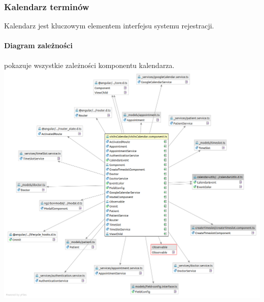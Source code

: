 \documentclass[polish,12pt]{aghthesis}
\begin{document}
\subsubsection{Kalendarz terminów}
Kalendarz jest kluczowym elementem interfejsu systemu rejestracji.
\paragraph{Diagram zależności} pokazuje wszystkie zależności komponentu kalendarza.
\includegraphics[width=\textwidth]{visitsCalendar_dep}
\end{document}
